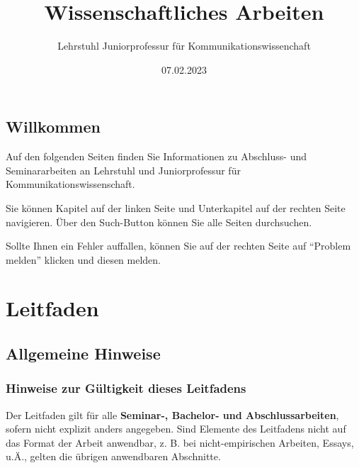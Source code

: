 \documentclass[
  letterpaper,
  DIV=11]{scrreprt}
\title{Wissenschaftliches Arbeiten}
\author{Lehrstuhl \textbar{} Juniorprofessur für
Kommunikationswissenchaft}
\date{07.02.2023}
\renewcommand*\contentsname{Inhaltsverzeichnis}
\newcommand\contentsname{Inhaltsverzeichnis}
\begin{document}
\maketitle
\ifdefined\Shaded\renewenvironment{Shaded}{\begin{tcolorbox}[sharp corners, borderline west={3pt}{0pt}{shadecolor}, enhanced, breakable, frame hidden, boxrule=0pt, interior hidden]}{\end{tcolorbox}}\fi

\renewcommand*\contentsname{Inhaltsverzeichnis}
{
\hypersetup{linkcolor=}
\setcounter{tocdepth}{2}
\tableofcontents
}

\hypertarget{willkommen}{%
\chapter*{Willkommen}\label{willkommen}}


Auf den folgenden Seiten finden Sie Informationen zu Abschluss- und
Seminararbeiten an Lehrstuhl und Juniorprofessur für
Kommunikationswissenschaft.

Sie können Kapitel auf der linken Seite und Unterkapitel auf der rechten
Seite navigieren. Über den Such-Button können Sie alle Seiten
durchsuchen.

Sollte Ihnen ein Fehler auffallen, können Sie auf der rechten Seite auf
``Problem melden'' klicken und diesen melden.

\part{Leitfaden}

\hypertarget{allgemeine-hinweise}{%
\chapter{Allgemeine Hinweise}\label{allgemeine-hinweise}}

\hypertarget{hinweise-zur-guxfcltigkeit-dieses-leitfadens}{%
\section{Hinweise zur Gültigkeit dieses
Leitfadens}\label{hinweise-zur-guxfcltigkeit-dieses-leitfadens}}

Der Leitfaden gilt für alle \textbf{Seminar-, Bachelor- und
Abschlussarbeiten}, sofern nicht explizit anders angegeben. Sind
Elemente des Leitfadens nicht auf das Format der Arbeit anwendbar, z. B.
bei nicht-empirischen Arbeiten, Essays, u.Ä., gelten die übrigen
anwendbaren Abschnitte.
\end{document}
